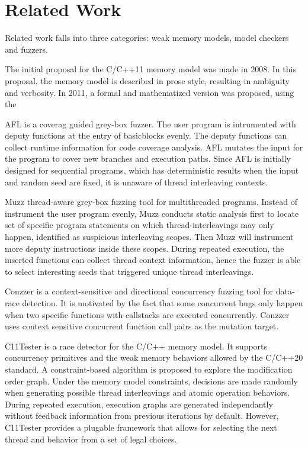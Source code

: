 \chapter{\label{cha:related}Related Work}

Related work falls into three categories: weak memory models, model checkers and fuzzers. 


The initial proposal for the C/C++11 memory model was made in 2008\cite{c++model-proposal}. In this proposal, the memory model is described in prose style, resulting in ambiguity and verbosity. In 2011, a formal and mathematized version was proposed, using the 




AFL\cite{afl} is a coverag guided grey-box fuzzer. The user program is intrumented with deputy functions at the entry of basicblocks evenly. The deputy functions can collect runtime information for code coverage analysis. AFL mutates the input for the program to cover new branches and execution paths. Since AFL is initially designed for sequential programs, which has deterministic results when the input and random seed are fixed, it is unaware of thread interleaving contexts. 

Muzz\cite{muzz} thread-aware grey-box fuzzing tool for multithreaded programs. Instead of instrument the user program evenly, Muzz conducts static analysis first to locate set of specific program statements on which thread-interleavings may only happen, identified as suspicious interleaving scopes. Then Muzz will instrument more deputy instructions inside these scopes. During repeated execution, the inserted functions can collect thread context information, hence the fuzzer is able to select interesting seeds that triggered unique thread interleavings. 

Conzzer\cite{conzzer} is a context-sensitive and directional concurrency fuzzing tool for data-race detection. It is motivated by the fact that some concurrent bugs only happen when two specific functions with callstacks are executed concurrently. Conzzer uses context sensitive concurrent function call pairs as the mutation target. 



 

C11Tester \cite{c11tester} is a race detector for the C/C++ memory model. It supports concurrency primitives and the weak memory behaviors allowed by the C/C++20 standard. A constraint-based algorithm is proposed to explore the modification order graph. Under the memory model constraints, decisions are made randomly when generating possible thread interleavings and atomic operation behaviors. During repeated execution, execution graphs are generated independantly without feedback information from previous iterations by default. However, C11Tester provides a plugable framework that allows for selecting the next thread and behavior from a set of legal choices.   





